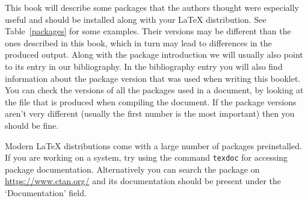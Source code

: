 This book will describe some packages that the authors thought were especially
useful and should be installed along with your \LaTeX{} distribution. See
Table~\ref{packages} for some examples. Their versions may be different than
the ones described in this book, which in turn may lead to differences in the
produced output. Along with the package introduction we will usually also point
to its entry in our bibliography. In the bibliography entry you will also find
information about the package version that was used when writing this booklet.
You can check the versions of all the packages used in a document, by looking
at the  file that is produced when compiling the document. If the
package versions aren't very different (usually the first number is the most
important) then you should be fine.

Modern \LaTeX{} distributions come with a large number of packages
preinstalled. If you are working on a \Unix{} system, try using the command
\texttt{texdoc} for accessing package documentation. Alternatively you can
search the package on \url{https://www.ctan.org/} and its documentation should
be present under the \enquote*{Documentation} field.

